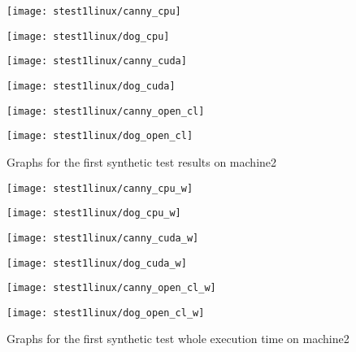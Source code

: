 \begin{figure}[H]
\centering
\begin{minipage}[t]{.49\textwidth}
\centering
\texttt{[image: stest1linux/canny\_cpu]}
\end{minipage}
\begin{minipage}[t]{.49\textwidth}
\centering
\texttt{[image: stest1linux/dog\_cpu]}
\end{minipage}
\begin{minipage}[t]{.49\textwidth}
\centering
\texttt{[image: stest1linux/canny\_cuda]}
\end{minipage}
\begin{minipage}[t]{.49\textwidth}
\centering
\texttt{[image: stest1linux/dog\_cuda]}
\end{minipage}
\begin{minipage}[t]{.49\textwidth}
\centering
\texttt{[image: stest1linux/canny\_open\_cl]}
\end{minipage}
\begin{minipage}[t]{.49\textwidth}
\centering
\texttt{[image: stest1linux/dog\_open\_cl]}
\end{minipage}
\caption{Graphs for the first synthetic test results on machine2}
\label{fig:test1sl}
\end{figure}

\begin{figure}[H]
\centering
\begin{minipage}[t]{.49\textwidth}
\centering
\texttt{[image: stest1linux/canny\_cpu\_w]}
\end{minipage}
\begin{minipage}[t]{.49\textwidth}
\centering
\texttt{[image: stest1linux/dog\_cpu\_w]}
\end{minipage}
\begin{minipage}[t]{.49\textwidth}
\centering
\texttt{[image: stest1linux/canny\_cuda\_w]}
\end{minipage}
\begin{minipage}[t]{.49\textwidth}
\centering
\texttt{[image: stest1linux/dog\_cuda\_w]}
\end{minipage}
\begin{minipage}[t]{.49\textwidth}
\centering
\texttt{[image: stest1linux/canny\_open\_cl\_w]}
\end{minipage}
\begin{minipage}[t]{.49\textwidth}
\centering
\texttt{[image: stest1linux/dog\_open\_cl\_w]}
\end{minipage}
\caption{Graphs for the first synthetic test whole execution time on machine2}
\label{fig:test1swl}
\end{figure}

